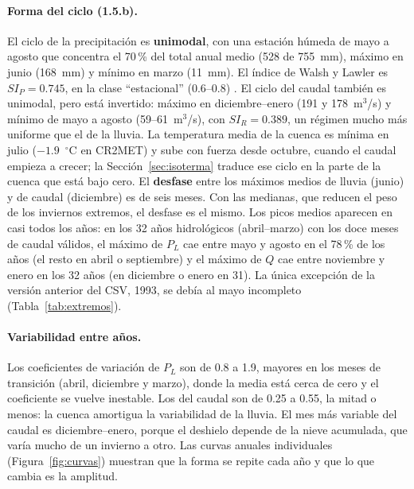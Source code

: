 \documentclass[11pt,a4paper]{article}
\newcommand{\PL}{P_L}
\newcommand{\Qm}{Q}
\begin{document}
\paragraph{Forma del ciclo (1.5.b).} El ciclo de la precipitación es \textbf{unimodal}, con una estación húmeda de mayo a agosto que concentra el 70\,\% del total anual medio (528 de 755~mm), máximo en junio (168~mm) y mínimo en marzo (11~mm). El índice de Walsh y Lawler es $SI_P=0.745$, en la clase ``estacional'' (0.6--0.8) \citep{WalshLawler1981}. El ciclo del caudal también es unimodal, pero está invertido: máximo en diciembre--enero (191 y 178~m$^3$/s) y mínimo de mayo a agosto (59--61~m$^3$/s), con $SI_R=0.389$, un régimen mucho más uniforme que el de la lluvia. La temperatura media de la cuenca es mínima en julio ($-1.9$~$^\circ$C en CR2MET) y sube con fuerza desde octubre, cuando el caudal empieza a crecer; la Sección~\ref{sec:isoterma} traduce ese ciclo en la parte de la cuenca que está bajo cero. El \textbf{desfase} entre los máximos medios de lluvia (junio) y de caudal (diciembre) es de seis meses. Con las medianas, que reducen el peso de los inviernos extremos, el desfase es el mismo. Los picos medios aparecen en casi todos los años: en los 32 años hidrológicos (abril--marzo) con los doce meses de caudal válidos, el máximo de $\PL$ cae entre mayo y agosto en el 78\,\% de los años (el resto en abril o septiembre) y el máximo de $\Qm$ cae entre noviembre y enero en los 32 años (en diciembre o enero en 31). La única excepción de la versión anterior del CSV, 1993, se debía al mayo incompleto (Tabla~\ref{tab:extremos}).

\paragraph{Variabilidad entre años.} Los coeficientes de variación de $\PL$ son de 0.8 a 1.9, mayores en los meses de transición (abril, diciembre y marzo), donde la media está cerca de cero y el coeficiente se vuelve inestable. Los del caudal son de 0.25 a 0.55, la mitad o menos: la cuenca amortigua la variabilidad de la lluvia. El mes más variable del caudal es diciembre--enero, porque el deshielo depende de la nieve acumulada, que varía mucho de un invierno a otro. Las curvas anuales individuales (Figura~\ref{fig:curvas}) muestran que la forma se repite cada año y que lo que cambia es la amplitud.
\end{document}
